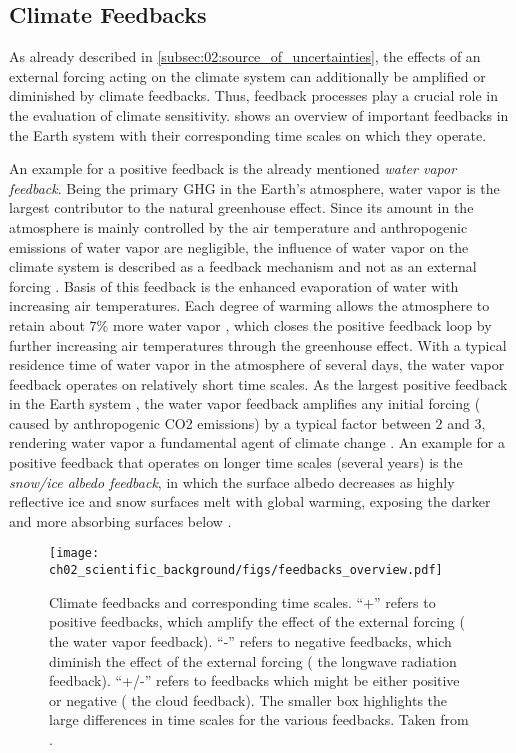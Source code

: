 \subsection{Climate Feedbacks}
\label{subsec:02:climate_feedbacks}

As already described in \cref{subsec:02:source_of_uncertainties}, the effects
of an external forcing acting on the climate system can additionally be
amplified or diminished by climate feedbacks. Thus, feedback processes play a
crucial role in the evaluation of climate sensitivity.
 shows an overview of important feedbacks in
the Earth system with their corresponding time scales on which they operate.

An example for a positive feedback is the already mentioned \emph{water vapor
  feedback}. Being the primary \ac{GHG} in the Earth's atmosphere, water vapor
is the largest contributor to the natural greenhouse effect. Since its amount
in the atmosphere is mainly controlled by the air temperature and anthropogenic
emissions of water vapor are negligible, the influence of water vapor on the
climate system is described as a feedback mechanism and not as an external
forcing \autocite{Myhre2013}. Basis of this feedback is the enhanced
evaporation of water with increasing air temperatures. Each degree of warming
allows the atmosphere to retain about $7 \unit{\%}$ more water vapor
\autocite{Myhre2013}, which closes the positive feedback loop by further
increasing air temperatures through the greenhouse effect. With a typical
residence time of water vapor in the atmosphere of several days, the water
vapor feedback operates on relatively short time scales. As the largest
positive feedback in the Earth system \autocite{Soden2006}, the water vapor
feedback amplifies any initial forcing (\eg{} caused by anthropogenic \ac{CO2}
emissions) by a typical factor between $2$ and $3$, rendering water vapor a
fundamental agent of climate change \autocite{Myhre2013}. An example for a
positive feedback that operates on longer time scales (several years) is the
\emph{snow/ice albedo feedback}, in which the surface albedo decreases as
highly reflective ice and snow surfaces melt with global warming, exposing the
darker and more absorbing surfaces below \autocite{Cubasch2013}.

\begin{figure}[t]
  \centering
  \texttt{[image: 
    ch02\_scientific\_background/figs/feedbacks\_overview.pdf]}
  \caption{Climate feedbacks and corresponding time scales. \enquote{+} refers
    to positive feedbacks, which amplify the effect of the external forcing
    (\eg{} the water vapor feedback). \enquote{-} refers to negative feedbacks,
    which diminish the effect of the external forcing (\eg{} the longwave
    radiation feedback). \enquote{+/-} refers to feedbacks which might be
    either positive or negative (\eg{} the cloud feedback). The smaller box
    highlights the large differences in time scales for the various feedbacks.
    Taken from \textcite{Cubasch2013}.}
  \label{fig:02:feedbacks_overview}
\end{figure}

